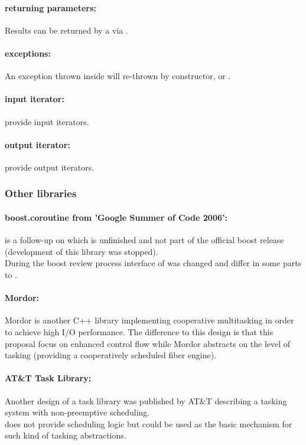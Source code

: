 \paragraph*{returning parameters:}
Results can be returned by a \corofunction via \pushcoroop.\\

\paragraph*{exceptions:}
An exception thrown inside \corofunction will re-thrown by \pullcoro
constructor, \pullcoroop or \pushcoroop.

\paragraph*{input iterator:}
\pullcoro provide input iterators.

\paragraph*{output iterator:}
\pushcoro provide output iterators.


\subsubsection*{Other libraries}
\paragraph*{boost.coroutine from 'Google Summer of Code 2006':}
\boostcoroutine is a follow-up on \boostcorosum which is unfinished and
not part of the official boost release (development of this library was
stopped).\\
During the boost review process interface of \boostcoroutine was changed and
differ in some parts to \boostcorosum.

\paragraph*{Mordor:}
Mordor\cite{mordor} is another C++ library implementing cooperative multitasking
in order to achieve high I/O performance. The difference to this design is that
this proposal focus on enhanced control flow while Mordor\cite{mordor} abstracts
on the level of tasking (providing a cooperatively scheduled fiber engine).

\paragraph*{AT\&T Task Library:}
Another design of a task library was published by AT\&T\cite{atnt1989} describing
a tasking system with non-preemptive scheduling.\\
\coro does not provide scheduling logic but could be used as the basic mechanism
for such kind of tasking abstractions.

